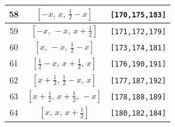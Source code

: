 \documentclass[fleqn,8pt]{jsarticle}
\begin{document}
\begin{longtable}{ccc}
58 & $\left[ - x,\, x,\, \frac{1}{2} - x \right]$ & {\tt [170,175,183]} \\ \hline
59 & $\left[ - x,\, - x,\, x + \frac{1}{2} \right]$ & {\tt [171,172,179]} \\ \hline
60 & $\left[ x,\, - x,\, \frac{1}{2} - x \right]$ & {\tt [173,174,181]} \\ \hline
61 & $\left[ \frac{1}{2} - x,\, x + \frac{1}{2},\, x \right]$ & {\tt [176,190,191]} \\ \hline
62 & $\left[ x + \frac{1}{2},\, \frac{1}{2} - x,\, x \right]$ & {\tt [177,187,192]} \\ \hline
63 & $\left[ x + \frac{1}{2},\, x + \frac{1}{2},\, - x \right]$ & {\tt [178,188,189]} \\ \hline
64 & $\left[ x,\, x,\, x + \frac{1}{2} \right]$ & {\tt [180,182,184]} \\
\end{longtable}
\renewcommand{\arraystretch}{1.2}
\end{document}
